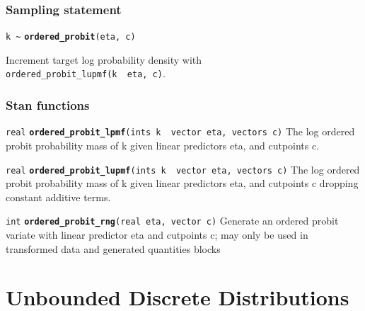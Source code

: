 \documentclass[
  10pt,
]{book}
\begin{document}
\hypertarget{sampling-statement-12}{%
\subsection{Sampling statement}\label{sampling-statement-12}}

\texttt{k\ \textasciitilde{}} \textbf{\texttt{ordered\_probit}}\texttt{(eta,\ c)}

Increment target log probability density with \texttt{ordered\_probit\_lupmf(k\ \textbar{}\ eta,\ c)}.

\hypertarget{stan-functions-11}{%
\subsection{Stan functions}\label{stan-functions-11}}


\texttt{real} \textbf{\texttt{ordered\_probit\_lpmf}}\texttt{(ints\ k\ \textbar{}\ vector\ eta,\ vectors\ c)}\newline
The log ordered probit probability mass of k given linear predictors
eta, and cutpoints c.


\texttt{real} \textbf{\texttt{ordered\_probit\_lupmf}}\texttt{(ints\ k\ \textbar{}\ vector\ eta,\ vectors\ c)}\newline
The log ordered probit probability mass of k given linear predictors
eta, and cutpoints c dropping constant additive terms.


\texttt{int} \textbf{\texttt{ordered\_probit\_rng}}\texttt{(real\ eta,\ vector\ c)}\newline
Generate an ordered probit variate with linear predictor eta and
cutpoints c; may only be used in transformed data and generated quantities blocks

\hypertarget{unbounded-discrete-distributions}{%
\chapter{Unbounded Discrete Distributions}\label{unbounded-discrete-distributions}}
\end{document}
